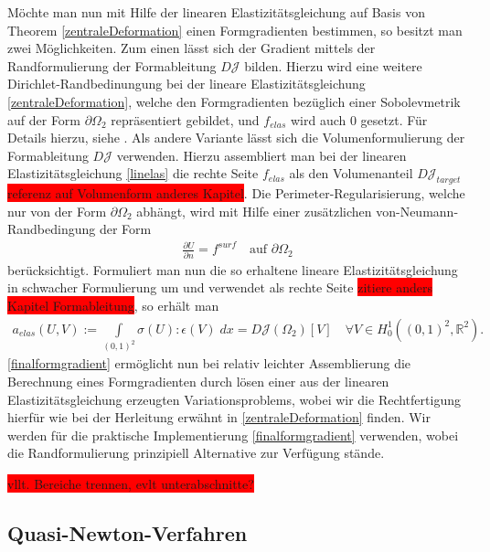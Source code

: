 Möchte man nun mit Hilfe der linearen Elastizitätsgleichung auf Basis von Theorem \ref{zentraleDeformation} einen Formgradienten bestimmen, so besitzt man zwei Möglichkeiten. Zum einen lässt sich der Gradient mittels der Randformulierung der Formableitung $D\mathcal{J}$ bilden. Hierzu wird eine weitere Dirichlet-Randbedinungung bei der lineare Elastizitätsgleichung \ref{zentraleDeformation}, welche den Formgradienten bezüglich einer Sobolevmetrik auf der Form $\partial\Omega_2$ repräsentiert gebildet, und $f_{elas}$ wird auch $0$ gesetzt. Für Details hierzu, siehe \cite{bfgs1}.
Als andere Variante lässt sich die Volumenformulierung der Formableitung $D\mathcal{J}$ verwenden. Hierzu assembliert man bei der linearen Elastizitätsgleichung \ref{linelas} die rechte Seite $f_{elas}$ als den Volumenanteil $D\mathcal{J}_{target}$ \colorbox{red}{referenz auf Volumenform anderes Kapitel}. Die Perimeter-Regularisierung, welche nur von der Form $\partial\Omega_2$ abhängt, wird mit Hilfe einer zusätzlichen von-Neumann-Randbedingung der Form
\begin{align*}
	\frac{\partial U}{\partial n} = f^{surf} \quad \text{auf } \partial\Omega_2
\end{align*}
berücksichtigt. Formuliert man nun die so erhaltene lineare Elastizitätsgleichung in schwacher Formulierung um und verwendet als rechte Seite \colorbox{red}{zitiere anders Kapitel Formableitung}, so erhält man
\begin{equation}\label{finalformgradient}
	\begin{aligned}
		a_{elas}(U,V) := \underset{(0,1)^2}{\int}\sigma(U):\epsilon(V) \;dx = D\mathcal{J}(\Omega_2)[V] \quad \forall V\in H^1_0((0,1)^2, \mathbb{R}^2).
	\end{aligned}
\end{equation}
\ref{finalformgradient} ermöglicht nun bei relativ leichter Assemblierung die Berechnung eines Formgradienten durch lösen einer aus der linearen Elastizitätsgleichung erzeugten Variationsproblems, wobei wir die Rechtfertigung hierfür wie bei der Herleitung erwähnt in \ref{zentraleDeformation} finden. Wir werden für die praktische Implementierung \ref{finalformgradient} verwenden, wobei die Randformulierung prinzipiell Alternative zur Verfügung stände. 

\colorbox{red}{vllt. Bereiche trennen, evlt unterabschnitte?}
\subsection{Quasi-Newton-Verfahren}

